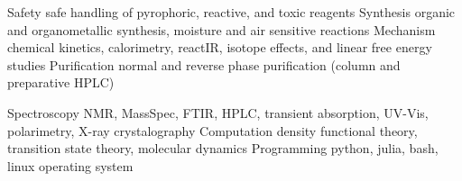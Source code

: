 

\begin{cvskills}
  \cvskill
  {Safety} %
  {safe handling of pyrophoric, reactive, and toxic reagents} %
  \cvskill
  {Synthesis} %
  {organic and organometallic synthesis, moisture and air sensitive reactions} %
  \cvskill
  {Mechanism} %
  {chemical kinetics, calorimetry, reactIR, isotope effects, and linear free energy studies} %
  \cvskill
  {Purification} %
  {normal and reverse phase purification (column and preparative HPLC) } %

  \cvskill
  {Spectroscopy} %
  {NMR, MassSpec, FTIR, HPLC, transient absorption, UV-Vis, polarimetry, X-ray crystalography} %
  \cvskill
  {Computation} %
  {density functional theory, transition state theory, molecular dynamics} %
  \cvskill
  {Programming} %
  {python, julia, bash, linux operating system} %

\end{cvskills}
